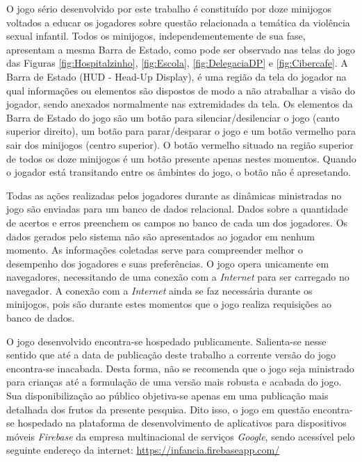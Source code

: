 O jogo sério desenvolvido por este trabalho é constituído por doze minijogos voltados a educar os jogadores sobre questão relacionada a temática da violência sexual infantil. Todos os minijogos, independementemente de sua fase, apresentam a mesma Barra de Estado, como pode ser observado nas telas do jogo das Figuras \ref{fig:Hospitalzinho}, \ref{fig:Escola}, \ref{fig:DelegaciaDP} e \ref{fig:Cibercafe}. A Barra de Estado (HUD - Head-Up Display), é uma região da tela do jogador na qual informações ou elementos são dispostos de modo a não atrabalhar a visão do jogador, sendo anexados normalmente nas extremidades da tela. Os elementos da Barra de Estado do jogo são um botão para silenciar/desilenciar o jogo (canto superior direito), um botão para parar/desparar o jogo e um botão vermelho para sair dos minijogos (centro superior). O botão vermelho situado na região superior de todos os doze minijogos é um botão presente apenas nestes momentos. Quando o jogador está transitando entre os âmbintes do jogo, o botão não é apresetando. 


Todas as ações realizadas pelos jogadores durante as dinâmicas ministradas no jogo são enviadas para um banco de dados relacional. Dados sobre a quantidade de acertos e erros preenchem os campos no banco de cada um dos jogadores. Os dados gerados pelo sistema não são apresentados ao jogador em nenhum momento. As informações coletadas serve para compreender melhor o desempenho dos jogadores e suas preferências. O jogo opera unicamente em navegadores, necessitando de uma conexão com a \textit{Internet} para ser carregado no navegador. A conexão com a \textit{Internet} ainda se faz necessária durante os minijogos, pois são durante estes momentos que o jogo realiza requisições ao banco de dados. 

O jogo desenvolvido encontra-se hospedado publicamente. Salienta-se nesse sentido que até a data de publicação deste trabalho a corrente versão do jogo encontra-se inacabada. Desta forma, não se recomenda que o jogo seja ministrado para crianças até a formulação de uma versão mais robusta e acabada do jogo. Sua disponibilização ao público objetiva-se apenas em uma publicação mais detalhada dos frutos da presente pesquisa. Dito isso, o jogo em questão encontra-se hospedado na plataforma de desenvolvimento de aplicativos para dispositivos móveis \textit{Firebase} da empresa multinacional de serviços \textit{Google}, sendo acessível pelo seguinte endereço da internet: \url{https://infancia.firebaseapp.com/}




